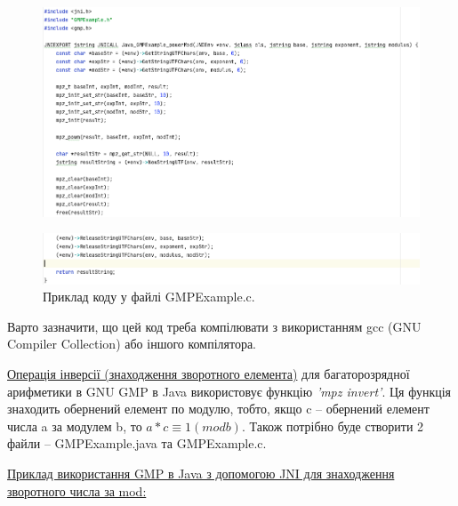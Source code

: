 \begin{figure}[h]
     \centering
     \includegraphics[scale = 0.5]{../IMAGES/Java/GMP_modPow_exC1.png}
     \label{fig_java_GMPpow_C1}
\end{figure}
\vspace{-1cm}
\begin{figure}[h]
     \centering
     \includegraphics[scale = 0.5]{../IMAGES/Java/GMP_modPow_exC2.png}
     \caption{Приклад коду у файлі GMPExample.c.}
     \label{fig_java_GMPpow_C2}
\end{figure}

\newpage
Варто зазначити, що цей код треба компілювати з використанням gcc (GNU Compiler Collection) або іншого компілятора.

\vspace{10pt}
\uline{Операція інверсії (знаходження зворотного елемента)} для багаторозрядної арифметики в GNU GMP в Java використовує функцію \textit{'mpz invert'}. Ця функція знаходить обернений елемент по модулю, тобто, якщо c -- обернений елемент числа a за модулем b, то $a * c  \equiv 1 (mod b)$. 
Також потрібно буде створити 2 файли -- GMPExample.java та GMPExample.c.

\newpage
\uline{Приклад використання GMP в Java з допомогою JNI для знаходження зворотного числа за mod:}

